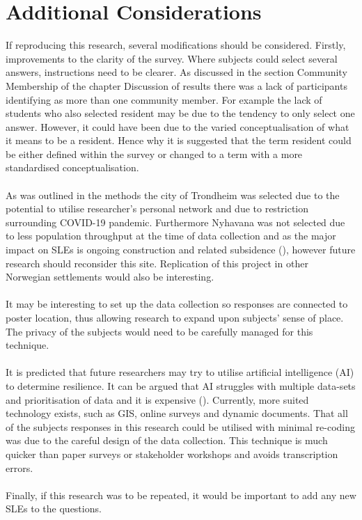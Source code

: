 \section{Additional Considerations}
If reproducing this research, several modifications should be considered. Firstly, improvements to the clarity of the survey. Where subjects could select several answers, instructions need to be clearer. As discussed in the section Community Membership of the chapter Discussion of results there was a lack of participants identifying as more than one community member. For example the lack of students who also selected resident may be due to the tendency to only select one answer. However, it could have been due to the varied conceptualisation of what it means to be a resident. Hence why it is suggested that the term resident could be either defined within the survey or changed to a term with a more standardised conceptualisation.  
\paragraph{}
As was outlined in the methods the city of Trondheim was selected due to the potential to utilise researcher's personal network and due to restriction surrounding COVID-19 pandemic. Furthermore Nyhavana was not selected due to less population throughput at the time of data collection and as the major impact on SLEs is ongoing construction and related subsidence (\cite{miljoenheten_og_byplankontoret_trondheim_kommune_9-notat-om-havnivastigning-og-stormflo---hensyn-i-arealplanlegging-nyhavnapdf_2020}), however future research should reconsider this site. Replication of this project in other Norwegian settlements would also be interesting. 

\paragraph{}
It may be interesting to set up the data collection so responses are connected to poster location, thus allowing research to expand upon subjects' sense of place. The privacy of the subjects would need to be carefully managed for this technique. 
\paragraph{}
It is predicted that future researchers may try to utilise artificial intelligence (AI) to determine resilience. It can be argued that AI struggles with multiple data-sets and prioritisation of data and it is expensive (\cite{shane_you_2019}). Currently, more suited technology exists, such as GIS, online surveys and dynamic documents. That all of the subjects responses in this research could be utilised with minimal re-coding was due to the careful design of the data collection. This technique is much quicker than paper surveys or stakeholder workshops and avoids transcription errors.
\paragraph{}
Finally, if this research was to be repeated, it would be important to add any new SLEs to the questions. 



